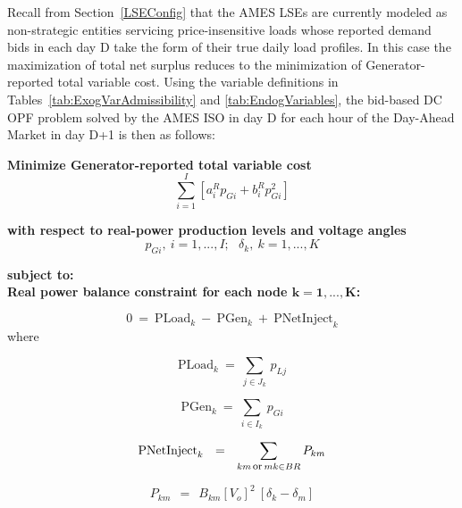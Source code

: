 \documentclass[12pt]{article}
\begin{document}
Recall from Section~\ref{LSEConfig} that the AMES LSEs are currently modeled as non-strategic entities servicing price-insensitive loads whose reported demand bids in each day D take the form of their true daily load profiles. In this case the maximization of total net surplus reduces to the minimization of Generator-reported total variable cost.  Using the variable definitions in Tables~\ref{tab:ExogVarAdmissibility} and \ref{tab:EndogVariables}, the bid-based DC OPF problem solved by the AMES ISO in day D for each hour of the Day-Ahead Market in day D+1 is then as follows:

\bigskip
\noindent \textbf{Minimize Generator-reported total variable cost}
\begin{equation} \label{DCOPFObjective}
	\sum_{i=1}^I [a^R_i p_{Gi} + b^R_i p_{Gi}^2 ]
\end{equation}

\noindent \textbf{with respect to real-power production levels and voltage angles}
\[ p_{Gi},~ i=1,...,I;~~~ \delta_k,~ k=1,...,K\] 


\noindent \textbf{subject to:}\\
\newline
\indent\textbf{Real power balance constraint for each node $\mathbf{k=1,...,K}$:}

                   \begin{equation} \label{dcPBalancek}
     0 ~ = ~  \mbox{PLoad}_k  ~ - ~
                 \mbox{PGen}_k ~ + ~ \mbox{PNetInject}_k 
                      \end{equation}
 \indent   where

                       \begin{equation}
             \mbox{PLoad}_k ~ = ~ \sum_{j \in J_k} \, p_{Lj} 
                       \end{equation}

                              \begin{equation}
             \mbox{PGen}_k ~ = ~ \sum_{i \in I_k} \, p_{Gi} 
                      \end{equation}

           \begin{equation}  \label{dcNetInject2}
    \mbox{PNetInject}_k ~~ = ~~ \sum_{km\,\mbox{\footnotesize or}\,mk\in BR} P_{km} 
    \end{equation}

\begin{equation}  \label{dcPowerFlow}
       P_{km} ~~ = ~~ B_{km}[V_o]^2~[ \delta_{k} - \delta_{m}]
\end{equation}
\end{document}
